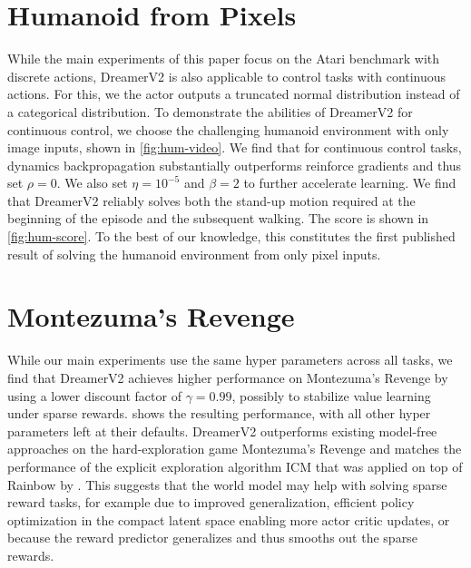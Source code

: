 \section{Humanoid from Pixels}
\label{seq:humanoid}




While the main experiments of this paper focus on the Atari benchmark with discrete actions, DreamerV2 is also applicable to control tasks with continuous actions. For this, we the actor outputs a truncated normal distribution instead of a categorical distribution. To demonstrate the abilities of DreamerV2 for continuous control, we choose the challenging humanoid environment with only image inputs, shown in \cref{fig:hum-video}. We find that for continuous control tasks, dynamics backpropagation substantially outperforms reinforce gradients and thus set $\rho=0$. We also set $\eta=10^{-5}$ and $\beta=2$ to further accelerate learning. We find that DreamerV2 reliably solves both the stand-up motion required at the beginning of the episode and the subsequent walking. The score is shown in \cref{fig:hum-score}. To the best of our knowledge, this constitutes the first published result of solving the humanoid environment from only pixel inputs.

\clearpage

\section{Montezuma's Revenge}
\label{seq:montezuma}




While our main experiments use the same hyper parameters across all tasks, we find that DreamerV2 achieves higher performance on Montezuma's Revenge by using a lower discount factor of $\gamma=0.99$, possibly to stabilize value learning under sparse rewards.  shows the resulting performance, with all other hyper parameters left at their defaults. DreamerV2 outperforms existing model-free approaches on the hard-exploration game Montezuma's Revenge and matches the performance of the explicit exploration algorithm ICM \citep{pathak2017icm} that was applied on top of Rainbow by \citet{taiga2019benchmark}. This suggests that the world model may help with solving sparse reward tasks, for example due to improved generalization, efficient policy optimization in the compact latent space enabling more actor critic updates, or because the reward predictor generalizes and thus smooths out the sparse rewards.

\clearpage
